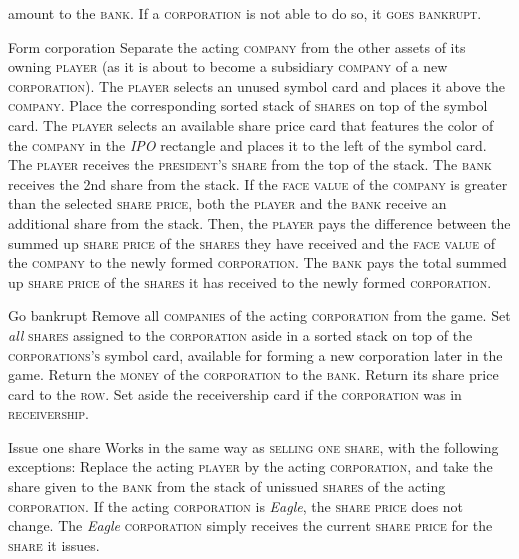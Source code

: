 \documentclass[11pt,a4paper]{article}
\newenvironment{my_description}
  {\begin{list}{}{\setlength{\labelwidth}{0pt}
   \leftmargin=1.2em
   \setlength{\itemindent}{-\leftmargin}
   \renewcommand{\makelabel}{\descriptionlabel}}
  \setlength{\itemsep}{1pt}
  \setlength{\parskip}{0pt}
  \setlength{\parsep}{0pt}
  }
  {\end{list}}
\begin{document}
\begin{multicols}{2}
{\begin{my_description}
  amount to the \textsc{bank}. If a \textsc{corporation} is not able
  to do so, it \textsc{goes bankrupt}.
\item[Form corporation] Separate the acting \textsc{company} from the
  other assets of its owning \textsc{player} (as it is about to become
  a subsidiary \textsc{company} of a new \textsc{corporation}). The
  \textsc{player} selects an unused symbol card and places it above
  the \textsc{company}. Place the corresponding sorted stack of
  \textsc{shares} on top of the symbol card. The \textsc{player}
  selects an available share price card that features the color of the
  \textsc{company} in the \emph{IPO} rectangle and places it to the
  left of the symbol card. The \textsc{player} receives the
  \textsc{president's} \textsc{share} from the top of the stack. The
  \textsc{bank} receives the 2nd share from the stack. If the
  \textsc{face value} of the \textsc{company} is greater than the
  selected \textsc{share price}, both the \textsc{player} and the
  \textsc{bank} receive an additional share from the stack. Then, the
  \textsc{player} pays the difference between the summed up
  \textsc{share price} of the \textsc{shares} they have received and
  the \textsc{face value} of the \textsc{company} to the newly formed
  \textsc{corporation}. The \textsc{bank} pays the total summed up
  \textsc{share price} of the \textsc{shares} it has received to the
  newly formed \textsc{corporation}.
\item[Go bankrupt] Remove all \textsc{companies} of the acting
  \textsc{corporation} from the game. Set \emph{all} \textsc{shares}
  assigned to the \textsc{corporation} aside in a sorted stack on top
  of the \textsc{corporations's} symbol card, available for forming a
  new corporation later in the game. Return the \textsc{money} of the
  \textsc{corporation} to the \textsc{bank}. Return its share price
  card to the \textsc{row}. Set aside the receivership card
  if the \textsc{corporation} was in \textsc{receivership}.
\item[Issue one share] Works in the same way as \textsc{selling one
    share}, with the following exceptions: Replace the acting
  \textsc{player} by the acting \textsc{corporation}, and take the
  share given to the \textsc{bank} from the stack of unissued
  \textsc{shares} of the acting \textsc{corporation}. If the acting
  \textsc{corporation} is \emph{Eagle}, the \textsc{share price} does
  not change. The \emph{Eagle} \textsc{corporation} simply receives
  the current \textsc{share price} for the \textsc{share} it issues.

\end{my_description}}
\end{multicols}
\end{document}
